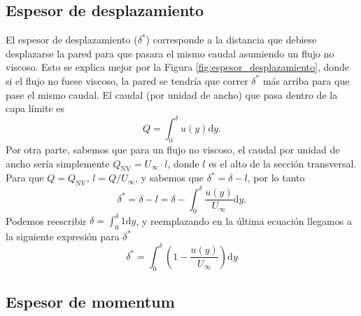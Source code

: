 \subsection*{Espesor de desplazamiento}
El espesor de desplazamiento ($\delta^*$) corresponde a la distancia que debiese desplazarse la pared para que pasara el mismo caudal asumiendo un flujo no viscoso. 
Esto se explica mejor por la Figura \ref{fig:espesor_desplazamiento}, donde si el flujo no fuese viscoso, la pared se tendría que correr $\delta^*$ más arriba para que pase el mismo caudal.
El caudal (por unidad de ancho) que pasa dentro de la capa límite es
%
\begin{equation}
Q = \int_0^\delta u(y)\mathrm{d}y.
\end{equation}
%
Por otra parte, sabemos que para un flujo no viscoso, el caudal por unidad de ancho sería simplemente $Q_\text{NV} = U_\infty \cdot l$, donde $l$ es el alto de la sección transversal.
Para que $Q=Q_\text{NV}$, $l=Q/U_\infty$, y sabemos que $\delta^*=\delta-l$, por lo tanto
%
\begin{equation}
\delta^* = \delta - l = \delta - \int_0^\delta \frac{u(y)}{U_\infty}\mathrm{d}y.
\end{equation}
%
Podemos reescribir $\delta = \int_0^\delta 1\mathrm{d}y$, y reemplazando en la última ecuación llegamos a la siguiente expresión para $\delta^*$
%
\begin{equation}\label{eq:espesor_desplazamiento}
\delta^* = \int_0^\delta \left(1-\frac{u(y)}{U_\infty}\right)\mathrm{d}y
\end{equation}

\subsection*{Espesor de momentum}
